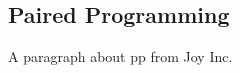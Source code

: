   
%
%
%
\def\titlename{Paired Programming\\ \medskip\large No I In Team}
\def\authorName{Allegan County GIS Services}
\def\pdfTitle{Paired Programming}
\def\pdfSubject{Production Philosophy} %
\def\pdfKeywords{mobile,gis}


\subsection{Paired Programming}
A paragraph about pp from Joy Inc.


